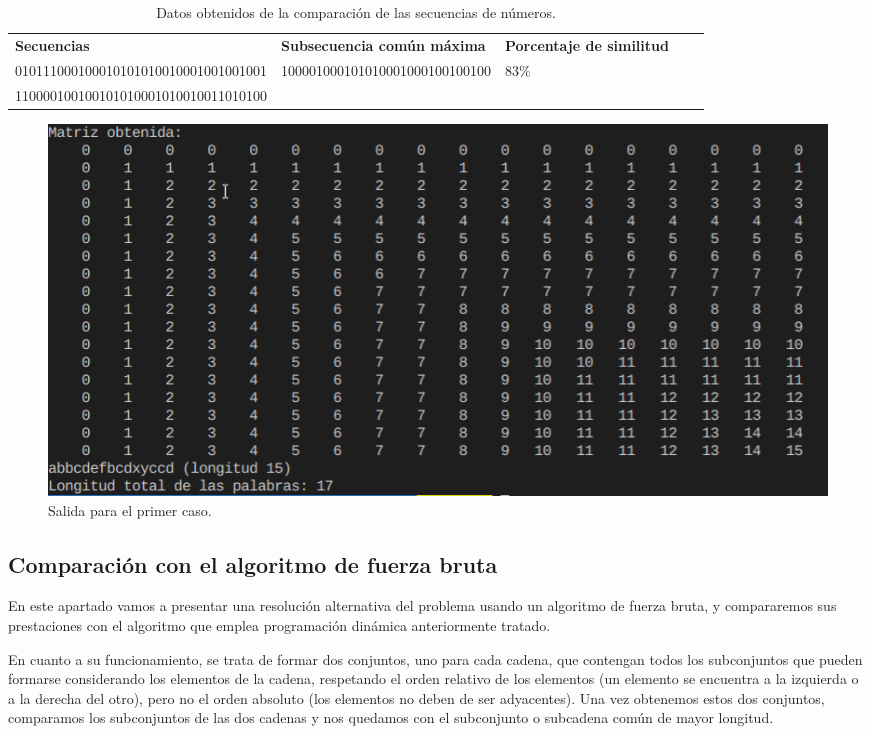 \begin{table}[h]
  \footnotesize
  \centering
\begin{tabular}{|l|l|l|ll}
  \cline{1-3}
  \textbf{Secuencias}                           & \textbf{Subsecuencia común máxima}                       & \textbf{Porcentaje de similitud}     &  &  \\ \cline{1-3}
  010111000100010101010010001001001001 & \multirow{2}{*}{100001000101010001000100100100} & \multirow{2}{*}{$83 \%$} &  &  \\ \cline{1-1}
  110000100100101010001010010011010100 &                                                 &                             &  &  \\ \cline{1-3}
\end{tabular}
\caption{Datos obtenidos de la comparación de las secuencias de números.}
\label{tab:s2}
\end{table}

\begin{figure}
  \centering
  \includegraphics[scale=0.67]{img/LettersMatrixResult.png}
  \caption{Salida para el primer caso.}
  \label{fig:1}
\end{figure}

\subsection{Comparación con el algoritmo de fuerza bruta}

En este apartado vamos a presentar una resolución alternativa del problema
usando un algoritmo de fuerza bruta, y compararemos sus prestaciones con el
algoritmo que emplea programación dinámica anteriormente tratado.

En cuanto a su funcionamiento, se trata de formar dos conjuntos, uno para cada cadena, que contengan todos los subconjuntos que pueden formarse considerando los elementos de la cadena, respetando el orden relativo de los elementos (un elemento se encuentra a la izquierda o a la derecha del otro), pero no el orden absoluto (los elementos no deben de ser adyacentes). Una vez obtenemos estos dos conjuntos, comparamos los subconjuntos de las dos cadenas y nos quedamos con el subconjunto 
o subcadena común de mayor longitud.

